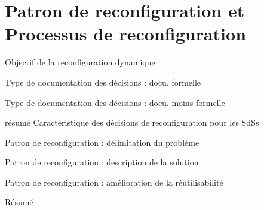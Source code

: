\section{Patron de reconfiguration et Processus de reconfiguration}

\begin{frame}{Objectif de la reconfiguration dynamique}
\end{frame}


\begin{frame}{Type de documentation des décisions : docu. formelle}
\end{frame}

\begin{frame}{Type de documentation des décisions : docu. moins
formelle}
\end{frame}


\begin{frame}{ résumé Caractéristique des décisions de reconfiguration
pour les SdSs}
\end{frame}


\begin{frame}{Patron de reconfiguration : délimitation du problème}
\end{frame}

\begin{frame}{Patron de reconfiguration : description de la solution}
\end{frame}

\begin{frame}{Patron de reconfiguration : amélioration de la
réutilisabilité}
\end{frame}

\begin{frame}{Résumé}
\end{frame}
